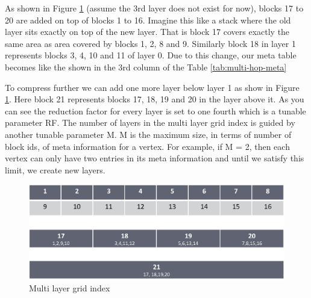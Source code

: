 {As shown in Figure \ref{fig:multi-grid2} (assume the 3rd layer does not exist for now), blocks 17 to 20 are added on top of blocks 1 to 16. Imagine this like a stack where the old layer sits exactly on top of the new layer. That is block 17 covers exactly the same area as area covered by blocks 1, 2, 8 and 9. Similarly block 18 in layer 1 represents blocks 3, 4, 10 and 11 of layer 0. Due to this change, our meta table becomes like the shown in the 3rd column of the Table \ref{tab:multi-hop-meta}


To compress further we can add one more layer below layer 1 as show in Figure \ref{fig:multi-grid2}. Here block 21 represents blocks 17, 18, 19 and 20 in the layer above it. As you can see the reduction factor for every layer is set to one fourth which is a tunable parameter RF. The number of layers in the multi layer grid index is guided by another tunable parameter M. M is the maximum size, in terms of number of block ids, of meta information for a vertex. For example, if M = 2, then each vertex can only have two entries in its meta information and until we satisfy this limit, we create new layers.

\begin{figure}[t]
    \centering
    \includegraphics[width=0.88\linewidth]{images/multi_layer_grid_index.eps}
    \caption{Multi layer grid index}
    \label{fig:multi-grid2}
\end{figure}

}

